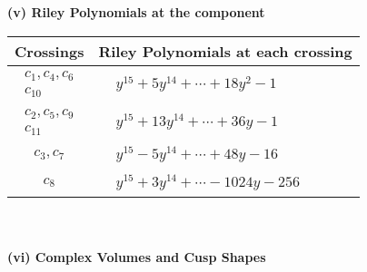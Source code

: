 \documentclass[1p]{elsarticle_modified}
\theoremstyle{definition}
\begin{document}
\newpage\renewcommand{\arraystretch}{1}
\flushleft \textbf{(v) Riley Polynomials at the component}\newline \\
\begin{tabular}{m{50pt}|m{274pt}}
Crossings & \hspace{64pt}Riley Polynomials at each crossing \\
\hline $$\begin{aligned}c_{1},c_{4},c_{6}\\c_{10}\end{aligned}$$&$\begin{aligned}
&y^{15}+5 y^{14}+\cdots+18 y^2-1
\end{aligned}$\\
\hline $$\begin{aligned}c_{2},c_{5},c_{9}\\c_{11}\end{aligned}$$&$\begin{aligned}
&y^{15}+13 y^{14}+\cdots+36 y-1
\end{aligned}$\\
\hline $$\begin{aligned}c_{3},c_{7}\end{aligned}$$&$\begin{aligned}
&y^{15}-5 y^{14}+\cdots+48 y-16
\end{aligned}$\\
\hline $$\begin{aligned}c_{8}\end{aligned}$$&$\begin{aligned}
&y^{15}+3 y^{14}+\cdots-1024 y-256
\end{aligned}$\\
\hline
\end{tabular}\\~\\
\newpage\flushleft \textbf{(vi) Complex Volumes and Cusp Shapes}
\end{document}
